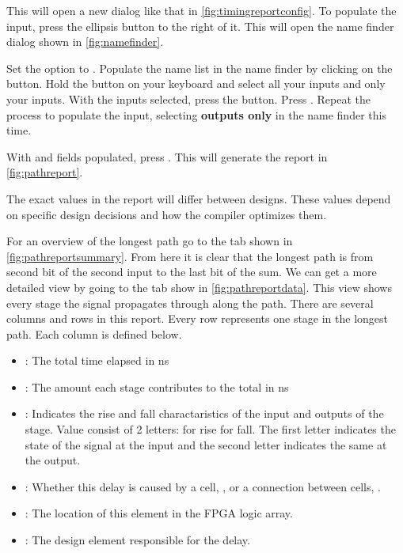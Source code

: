 \documentclass[12pt]{betterjournal}
\begin{document}
\begin{minipage}[t]{0.45\textwidth}
\vspace{-112mm}
This will open a new dialog like that in \autoref{fig:timingreportconfig}. To populate the  input, press the ellipsis button to the right of it. This will open the name finder dialog shown in \autoref{fig:namefinder}. 

Set the  option to . Populate the name list in the name finder by clicking on the  button. Hold the  button on your keyboard and select all your inputs and only your inputs. With the inputs selected, press the \keyword{$>$} button. Press . Repeat the process to populate the  input, selecting \textbf{outputs only} in the name finder this time.

With  and  fields populated, press . This will generate the report in \autoref{fig:pathreport}.
\hfill\break
\begin{extra}[frametitle={Report Values}]
    The exact values in the report will differ between designs. These values depend on specific design decisions and how the compiler optimizes them.
\end{extra}
\hfill\break
\end{minipage}

\clearpage

For an overview of the longest path go to the  tab shown in \autoref{fig:pathreportsummary}. From here it is clear that the longest path is from second bit of the second input to the last bit of the sum. We can get a more detailed view by going to the  tab show in \autoref{fig:pathreportdata}. This view shows every stage the signal propagates through along the path. There are several columns and rows in this report. Every row represents one stage in the longest path. Each column is defined below.
\begin{itemize}
    \item {}: The total time elapsed in ns
    \item {}: The amount each stage contributes to the total in ns
    \item {}: Indicates the rise and fall charactaristics of the input and outputs of the stage. Value consist of 2 letters:  for rise  for fall. The first letter indicates the state of the signal at the input and the second letter indicates the same at the output.
    \item {}: Whether this delay is caused by a cell, , or a connection between cells, .
    \item {}: The location of this element in the FPGA logic array.
    \item {}: The design element responsible for the delay.
\end{itemize}
\end{document}

